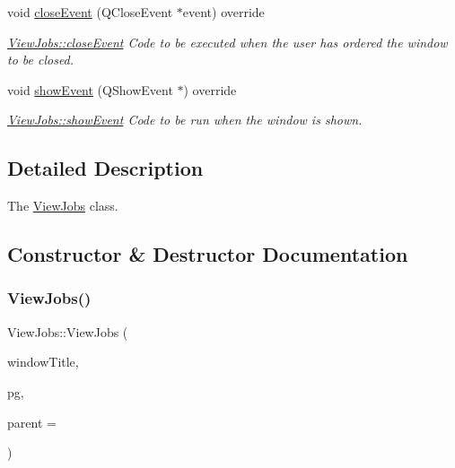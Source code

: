 \begin{DoxyCompactItemize}
void \mbox{\hyperlink{class_view_jobs_a832503ca9eb4e4bf79c2fb48a59141aa}{close\+Event}} (Q\+Close\+Event $\ast$event) override
\begin{DoxyCompactList}\small\item\em \mbox{\hyperlink{class_view_jobs_a832503ca9eb4e4bf79c2fb48a59141aa}{View\+Jobs\+::close\+Event}} Code to be executed when the user has ordered the window to be closed. \end{DoxyCompactList}\item 
\mbox{\label{class_view_jobs_a50f3a52f43e097d46e106e0aa31e9eb4}} 
void \mbox{\hyperlink{class_view_jobs_a50f3a52f43e097d46e106e0aa31e9eb4}{show\+Event}} (Q\+Show\+Event $\ast$) override
\begin{DoxyCompactList}\small\item\em \mbox{\hyperlink{class_view_jobs_a50f3a52f43e097d46e106e0aa31e9eb4}{View\+Jobs\+::show\+Event}} Code to be run when the window is shown. \end{DoxyCompactList}\end{DoxyCompactItemize}


\subsection{Detailed Description}
The \mbox{\hyperlink{class_view_jobs}{View\+Jobs}} class. 

\subsection{Constructor \& Destructor Documentation}
\mbox{\label{class_view_jobs_ac78f48cc812a0348a233f33dc78a71cc}} 
\subsubsection{\texorpdfstring{View\+Jobs()}{ViewJobs()}}
{\footnotesize\ttfamily View\+Jobs\+::\+View\+Jobs (\begin{DoxyParamCaption}\item[{Q\+String}]{window\+Title,  }\item[{\mbox{\hyperlink{classpsql}{psql}} $\ast$}]{pg,  }\item[{Q\+Widget $\ast$}]{parent = {} }\end{DoxyParamCaption})\hspace{0.3cm}{\ttfamily [explicit]}}



